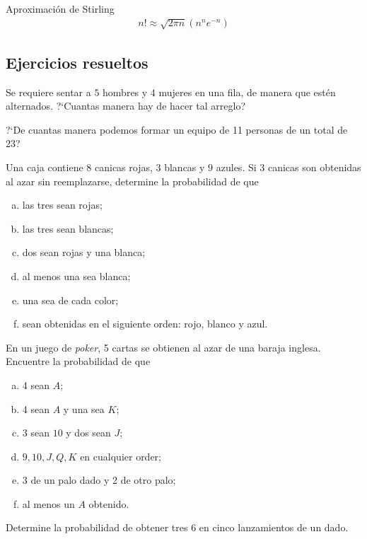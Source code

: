 {Aproximación de Stirling}
\begin{align}
 \label{1.33}
 n! \approx \sqrt{2\pi n}\left( n^{n}e^{-n} \right)
\end{align}


 \subsection{Ejercicios resueltos}
 {}
  \begin{ejemplo}
   \label{solved:1.22}
 	Se requiere sentar a $5$ hombres y $4$ mujeres en una fila, de manera que estén alternados. ?`Cuantas manera hay de hacer tal arreglo?
  \end{ejemplo}
 
 {}
  \begin{ejemplo}
   \label{solved:1.29}
 	?`De cuantas manera podemos formar un equipo de 11 personas de un total de 23?
  \end{ejemplo}
 
 {}
  \begin{ejemplo}
   \label{solved:1.35}
 	Una caja contiene $8$ canicas rojas, $3$ blancas y $9$ azules. Si 3 canicas son obtenidas al azar sin reemplazarse, determine la probabilidad de que
 	\begin{enumerate}[(a)]
 	 \item las tres sean rojas; 
 	 \item las tres sean blancas; 
 	 \item dos sean rojas y una blanca; 
 	 \item al menos una sea blanca; 
 	 \item una sea de cada color; 
 	 \item sean obtenidas en el siguiente orden: rojo, blanco y azul.
 	\end{enumerate}

  \end{ejemplo}
 
 {}
  \begin{ejemplo}
   \label{solved:1.36}
 	En un juego de \emph{poker}, 5 cartas se obtienen al azar de una baraja inglesa. Encuentre la probabilidad de que
 	\begin{enumerate}[(a)]
 	 \item 4 sean $A$; 
 	 \item 4 sean $A$ y una sea $K$; 
 	 \item 3 sean $10$ y dos sean $J$; 
 	 \item $9,10,J,Q,K$ en cualquier order; 
 	 \item 3 de un palo dado y 2 de otro palo; 
 	 \item al menos un $A$ obtenido.
 	\end{enumerate}

  \end{ejemplo}
 
 {}
  \begin{ejemplo}
   \label{solved:1.37}
 		Determine la probabilidad de obtener tres $6$ en cinco lanzamientos de un dado.
  \end{ejemplo}
 
%
